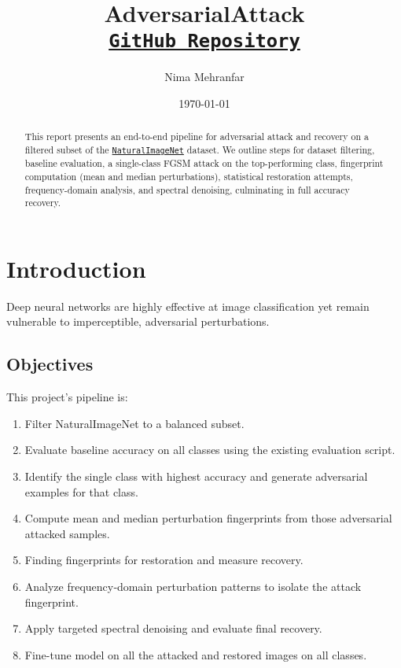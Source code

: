 \documentclass[a4paper,12pt]{report}
\title{AdversarialAttack\\
\vspace{0.5cm}\href{https://github.com/nimamehranfar/AdversarialAttack}{\texttt{GitHub Repository}}}
\author{Nima Mehranfar}
\date{\today}
\begin{document}
\maketitle

\begin{abstract}
This report presents an end-to-end pipeline for adversarial attack and recovery on a filtered subset of the \href{https://github.com/nimamehranfar/AdversarialAttack}{\texttt{NaturalImageNet}} dataset. We outline steps for dataset filtering, baseline evaluation, a single-class FGSM attack on the top-performing class, fingerprint computation (mean and median perturbations), statistical restoration attempts, frequency-domain analysis, and spectral denoising, culminating in full accuracy recovery.
\end{abstract}

\tableofcontents
\newpage

\listoffigures
\newpage

\listoftables
\newpage

\chapter{Introduction}
Deep neural networks are highly effective at image classification yet remain vulnerable to imperceptible, adversarial perturbations.

\section{Objectives}
This project’s pipeline is:
\begin{enumerate}
\item Filter NaturalImageNet to a balanced subset.
\item Evaluate baseline accuracy on all classes using the existing evaluation script.
\item Identify the single class with highest accuracy and generate adversarial examples for that class.
\item Compute mean and median perturbation fingerprints from those adversarial attacked samples.
\item Finding fingerprints for restoration and measure recovery.
\item Analyze frequency‑domain perturbation patterns to isolate the attack fingerprint.
\item Apply targeted spectral denoising and evaluate final recovery.
\item Fine-tune model on all the attacked and restored images on all classes.
\end{enumerate}
\end{document}
